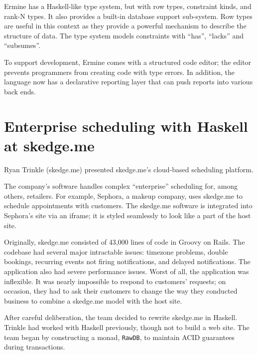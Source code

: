 \documentclass{jfp1}
\begin{document}
Ermine has a Haskell-like type system, but with row types, constraint
kinds, and rank-N types. It also provides a built-in database support
sub-system.  Row types are useful in this context as they provide a
powerful mechanism to describe the structure of data. The type system
models constraints with ``has'', ``lacks'' and ``subsumes''.

To support development, Ermine comes with a structured code editor; the
editor prevents programmers from creating code with type errors. In
addition, the language now has a declarative reporting layer that can push
reports into various back ends.

\section{Enterprise scheduling with Haskell at skedge.me}


Ryan Trinkle (skedge.me) presented skedge.me's cloud-based scheduling
platform.

The company's software handles complex ``enterprise'' scheduling for, among
others, retailers. For example, Sephora, a makeup company, uses skedge.me
to schedule appointments with customers. The skedge.me software is
integrated into Sephora's site via an iframe; it is styled seamlessly to
look like a part of the host site.

Originally, skedge.me consisted of 43,000 lines of code in Groovy on Rails.
The codebase had several major intractable issues: timezone problems,
double bookings, recurring events not firing notifications, and delayed
notifications. The application also had severe performance issues.  Worst
of all, the application was inflexible. It was nearly impossible to respond
to customers' requests; on occasion, they had to ask their customers to
change the way they conducted business to combine a skedge.me model with
the host site. 

After careful deliberation, the team decided to rewrite skedge.me in
Haskell. Trinkle had worked with Haskell previously, though not to build a
web site. The team began by constructing a monad, \texttt{RawDB}, to
maintain ACID guarantees during transactions. 
\end{document}
